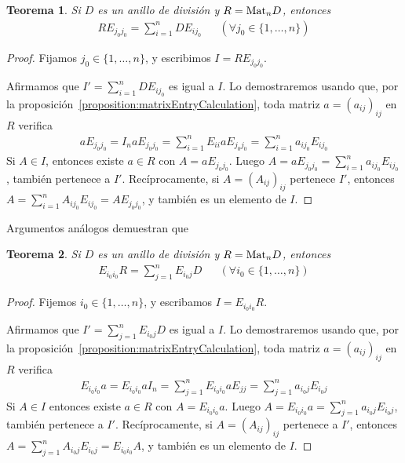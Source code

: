 \documentclass{report}
\newcommand{\Mat}{\textnormal{Mat}}
\newtheorem{theorem}{Teorema}
\begin{document}
  \begin{theorem}\label{theorem:matricesWhereAlmostEveryColumnIsNull}
    Si \(D\) es un anillo de división y \(R = \Mat_n D\), entonces 
    \begin{align}
      R E_{j_0 j_0}
      =
      \sum_{i = 1}^n D E_{i j_0}
      &&(\forall j_0 \in \{1, \dots, n\})
    \end{align}
  \end{theorem}
  \begin{proof}
    Fijamos \(j_0 \in \{1, \dots, n\}\), y escribimos \(I = R E_{j_0 j_0}\).

    Afirmamos que \(I' = \sum_{i = 1}^n D E_{i j_0}\) es igual a \(I\).
    Lo demostraremos usando que, por la proposición~\ref{proposition:matrixEntryCalculation}, toda matriz \(a = {(a_{i j})}_{i j}\) en \(R\) verifica
    \begin{align}
      a E_{j_0 j_0}
      =
      I_n a E_{j_0 j_0}
      =
      \sum_{i = 1}^n E_{i i} a E_{j_0 j_0}
      =
      \sum_{i = 1}^n a_{i j_0} E_{i j_0}
    \end{align}
    Si \(A \in I\), entonces existe \(a \in R\) con \(A = a E_{j_0 j_0}\).
    Luego \(A = a E_{j_0 j_0} = \sum_{i = 1}^n a_{i j_0} E_{i j_0}\), también pertenece a \(I'\).
    Recíprocamente, si \(A = {(A_{i j})}_{i j}\) pertenece \(I'\), entonces \(A = \sum_{i = 1}^n A_{i j_0} E_{i j_0} = A E_{j_0 j_0}\), y también es un elemento de \(I\).
  \end{proof}

  Argumentos análogos demuestran que
  \begin{theorem}\label{theorem:matricesWhereAlmostEveryRowIsNull}
    Si \(D\) es un anillo de división y \(R = \Mat_n D\), entonces
    \begin{align}
      \displaystyle
      E_{i_0 i_0} R
      =
      \sum_{j = 1}^n E_{i_0 j} D
      &&(\forall i_0 \in \{1, \dots, n\})
    \end{align}
  \end{theorem}
  \begin{proof}
    Fijemos \(i_0 \in \{1, \dots, n\}\), y escribamos \(I = E_{i_0 i_0} R\).

    Afirmamos que \(I' = \sum_{j = 1}^n E_{i_0 j} D\) es igual a \(I\).
    Lo demostraremos usando que, por la proposición~\ref{proposition:matrixEntryCalculation}, toda matriz \(a = {(a_{i j})}_{i j}\) en \(R\) verifica
    \begin{align}
      E_{i_0 i_0} a
      =
      E_{i_0 i_0} a I_n
      =
      \sum_{j = 1}^n E_{i_0 i_0} a E_{j j}
      =
      \sum_{j = 1}^n a_{i_0 j} E_{i_0 j}
    \end{align}
    Si \(A \in I\) entonces existe \(a \in R\) con \(A = E_{i_0 i_0} a\).
    Luego \(A = E_{i_0 i_0} a = \sum_{j = 1}^n a_{i_0 j} E_{i_0 j}\), también pertenece a \(I'\).
    Recíprocamente, si \(A = {(A_{i j})}_{i j}\) pertenece a \(I'\), entonces \(A = \sum_{j = 1}^n A_{i_0 j} E_{i_0 j} = E_{i_0 i_0} A\), y también es un elemento de \(I\).
  \end{proof}
\end{document}
